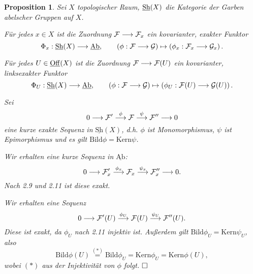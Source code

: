 \documentclass[11pt]{book}
\newtheorem{proposition}[theorem]{Proposition}
\theoremstyle{nonumberbreak}
\newenvironment{pr}[1][]{\ifthenelse{\equal{#1}{}}{\proof}{\proof[#1]}\rm}{\endproof}
\newenvironment{bemdefin}[1][]{\ifthenelse{\equal{#1}{}}{\bemdefini}{\bemdefini[#1]}\rm}{\endbemdefini}
\begin{document}
\begin{spacing}{1.4}
\begin{proposition}  %
Sei $X$ topologischer Raum, $\underline{\rm{Sh}}(X)$ die Kategorie der Garben abelscher Gruppen auf $X$.
\begin{compactenum}
\item Für jedes $x \in X$ ist die Zuordnung $\mathcal{F} \longrightarrow \mathcal{F}_x$ ein kovarianter, exakter Funktor
$$\Phi_x: \underline{\mathrm{Sh}}(X) \longrightarrow \underline{\mathrm{Ab}}, \qquad \left( \phi: \mathcal{F} \longrightarrow \mathcal{G}\right) \mapsto \left( \phi_x: \mathcal{F}_x \longrightarrow \mathcal{G}_x\right).$$
\item Für jedes $U \in \underline{\rm{Off}}(X)$ ist die Zuordnung $\mathcal{F} \longrightarrow \mathcal{F}(U)$ ein kovarianter, linksexakter Funktor
$$\Phi_U: \underline{\mathrm{Sh}}(X) \longrightarrow \underline{\mathrm{Ab}}, \qquad \left( \phi: \mathcal{F} \longrightarrow \mathcal{G} \right) \mapsto \left( \phi_U: \mathcal{F}(U) \longrightarrow \mathcal{G}(U) \right).$$
\end{compactenum}
\begin{pr}
Sei 
$$0 \longrightarrow \mathcal{F}' \overset{\phi}{\longrightarrow} \mathcal{F} \overset{\psi}{\longrightarrow} \mathcal{F}'' \longrightarrow 0$$
eine kurze exakte Sequenz in $\underline{\textrm{Sh}}(X)$, d.h. $\phi$ ist Monomorphismus, $\psi$ ist Epimorphismus und es gilt $\textrm{Bild} \phi = \textrm{Kern} \psi$. 
\begin{compactenum}
\item Wir erhalten eine kurze Sequenz in $\underline{\textrm{Ab}}$:
$$0 \longrightarrow \mathcal{F}_x' \overset{\phi_x}{\longrightarrow} \mathcal{F}_x \overset{\psi_x}{\longrightarrow} \mathcal{F}_x'' \longrightarrow 0.$$
Nach 2.9 und 2.11 ist diese exakt.
\item Wir erhalten eine Sequenz 
$$0 \longrightarrow \mathcal{F}'(U) \overset{\phi_U}{\longrightarrow} \mathcal{F}(U) \overset{\psi_U}{\longrightarrow} \mathcal{F}''(U).$$
Diese ist exakt, da $\phi_U$ nach 2.11 injektiv ist. Außerdem gilt $\textrm{Bild} \phi_U = \textrm{Kern} \psi_U$, also 
$$\textrm{Bild} \phi(U) \overset{(*)}{=} \textrm{Bild} \phi_U = \textrm{Kern} \phi_U = \textrm{Kern} \phi(U),$$
wobei $(*)$ aus der Injektivität von $\phi$ folgt.  $\hfill \Box$
\end{compactenum}
\end{pr}

\end{proposition}


\begin{bemdefin}   %


\end{bemdefin}
\end{spacing}
\end{document}
